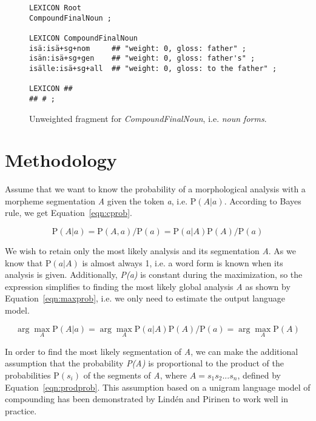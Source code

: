 \documentclass[a4paper]{article}
\begin{document}
\begin{figure}[h!]
  \centering
  \begin{scriptsize}
\begin{verbatim}
LEXICON Root
CompoundFinalNoun ;

LEXICON CompoundFinalNoun
isä:isä+sg+nom     ## "weight: 0, gloss: father" ;
isän:isä+sg+gen    ## "weight: 0, gloss: father's" ;
isälle:isä+sg+all  ## "weight: 0, gloss: to the father" ;

LEXICON ##
## # ;
\end{verbatim}
  \end{scriptsize}
  \caption{Unweighted fragment for \emph{CompoundFinalNoun}, i.e.
    \emph{noun forms}.}\label{fig:unweighted2}
\end{figure}


\section{Methodology}  
\label{Sect3}

Assume that we want to know the probability of a morphological
analysis with a morpheme segmentation \emph{A} given the token
\emph{a}, i.e. $\mathrm{P}(A|a)$. According to Bayes rule, we get
Equation~\ref{eqn:cprob}.

\begin{equation}
  \label{eqn:cprob}
  \mathrm{P}(A|a) = \mathrm{P}(A,a)/\mathrm{P}(a) = \mathrm{P}(a|A) \mathrm{P}(A)/\mathrm{P}(a)
\end{equation}

We wish to retain only the most likely analysis and its segmentation
\emph{A}. As we know that $\mathrm{P}(a|A)$ is almost always 1, i.e. a
word form is known when its analysis is given. Additionally,
\emph{P(a)} is constant during the maximization, so the expression
simplifies to finding the most likely global analysis \emph{A} as
shown by Equation~\ref{eqn:maxprob}, i.e. we only need to estimate the
output language model.

\begin{equation}
  \label{eqn:maxprob}
  \arg\max_{A} \mathrm{P}(A|a) = \arg\max_{A} \mathrm{P}(a|A) \mathrm{P}(A)/\mathrm{P}(a) = \arg\max_{A} \mathrm{P}(A)
\end{equation}

In order to find the most likely segmentation of \emph{A}, we can make
the additional assumption that the probability \emph{P(A)} is
proportional to the product of the probabilities $\mathrm{P}(s_i)$ of
the segments of \emph{A}, where $A=s_1s_2...s_n$, defined by
Equation~\ref{eqn:prodprob}. This assumption based on a unigram
language model of compounding has been demonstrated by Lindén and
Pirinen \cite{linden09nodalida} to work well in practice.
\end{document}
